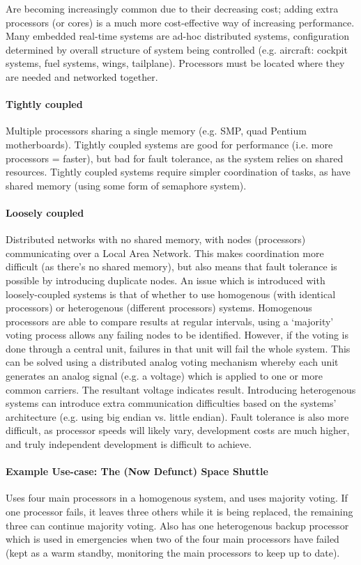 \documentclass[a4paper,oneside]{report}
\begin{document}
	Are becoming increasingly common due to their decreasing cost; adding extra processors (or cores) is a much more cost-effective way of increasing performance. Many embedded real-time systems are ad-hoc distributed systems, configuration determined by overall structure of system being controlled (e.g. aircraft: cockpit systems, fuel systems, wings, tailplane). Processors must be located where they are needed and networked together.
	
    	\paragraph{Tightly coupled}	Multiple processors sharing a single memory (e.g. SMP, quad Pentium motherboards). Tightly coupled systems are good for performance (i.e. more processors = faster), but bad for fault tolerance, as the system relies on shared resources. Tightly coupled systems require simpler coordination of tasks, as have shared memory (using some form of semaphore system).
    	
    	\paragraph{Loosely coupled} Distributed networks with no shared memory, with nodes (processors) communicating over a Local Area Network. This makes coordination more difficult (as there's no shared memory), but also means that fault tolerance is possible by introducing duplicate nodes. An issue which is introduced with loosely-coupled systems is that of whether to use homogenous (with identical processors) or heterogenous (different processors) systems. Homogenous processors are able to compare results at regular intervals, using a `majority' voting process allows any failing nodes to be identified. However, if the voting is done through a central unit, failures in that unit will fail the whole system. This can be solved using a distributed analog voting mechanism whereby each unit generates an analog signal (e.g. a voltage) which is applied to one or more common carriers. The resultant voltage indicates result. Introducing heterogenous systems can introduce extra communication difficulties based on the systems' architecture (e.g. using big endian vs. little endian). Fault tolerance is also more difficult, as processor speeds will likely vary, development costs are much higher, and truly independent development is difficult to achieve.
    	
    	\paragraph{Example Use-case: The (Now Defunct) Space Shuttle} 
    	Uses four main processors in a homogenous system, and uses majority voting. If one processor fails, it leaves three others while it is being replaced, the remaining three can continue majority voting. Also has one heterogenous backup processor which is used in emergencies when two of the four main processors have failed (kept as a warm standby, monitoring the main processors to keep up to date).
    	
\end{document}
